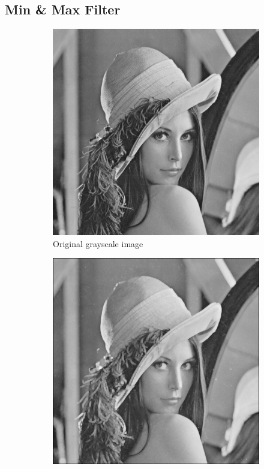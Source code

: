 \documentclass[a4paper,16pt]{article}
\begin{document}
	\subsection{Min \& Max  Filter}
	\vspace{0.05in}
	
	\vspace{0.2in}
	\begin{figure}[h!]
		\begin{subfigure}[h!]{0.3\linewidth}
			\includegraphics[width=\linewidth]{grayscale}
			\caption{Original grayscale image}
		\end{subfigure}
		\hfill
		\begin{subfigure}[h!]{0.3\linewidth}
			\includegraphics[width=\linewidth]{maxfilter}

\end{subfigure}
\end{figure}
\end{document}
